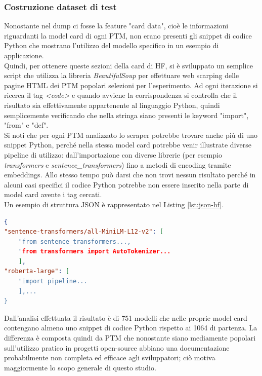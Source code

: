 \documentclass{article}
\begin{document}
\subsubsection{Costruzione dataset di test}
Nonostante nel dump \cite{ait_hfcommunity_2023}  ci fosse la feature "card data", cioè le informazioni riguardanti la model card di ogni PTM, non erano presenti gli snippet di codice Python che mostrano l'utilizzo del modello specifico in un esempio di applicazione.\\  
Quindi, per ottenere queste sezioni della card di HF, si è sviluppato un semplice script che utilizza la libreria \textit{BeautifulSoup}\cite{Richardson_Beautiful_Soup} per effettuare web scarping delle pagine HTML dei PTM popolari selezioni per l'esperimento. Ad ogni iterazione si ricerca il tag \textit{\textless code\textgreater} e quando avviene la corrispondenza si controlla che il risultato sia effettivamente appartenente al linguaggio Python, quindi semplicemente verificando che nella stringa siano presenti le keyword "import", "from" e "def".\\
Si noti che per ogni PTM analizzato lo scraper potrebbe trovare anche più di uno snippet Python, perché nella stessa model card potrebbe venir illustrate diverse pipeline di utilizzo: dall'importazione con diverse librerie (per esempio \textit{transformers} e \textit{sentence\_transformers}) fino a metodi di encoding tramite embeddings. Allo stesso tempo può darsi che non trovi nessun risultato perché in alcuni casi specifici il codice Python potrebbe non essere inserito nella parte di model card avente i tag cercati.\\
Un esempio di struttura JSON è rappresentato nel Listing \ref{lst:json-hf}.\\
\begin{lstlisting}[language=json, caption={Esempio di struttura per le card ufficiali di HF}, label={lst:json-hf}]
{
"sentence-transformers/all-MiniLM-L12-v2": [ 
    "from sentence_transformers..., 
    "from transformers import AutoTokenizer...
    ],
"roberta-large": [
    "import pipeline...
    ],...
}
\end{lstlisting}
Dall'analisi effettuata il risultato è di 751 modelli che nelle proprie model card contengano almeno uno snippet di codice Python rispetto ai 1064 di partenza. La differenza è composta quindi da PTM che nonostante siano mediamente popolari sull'utilizzo pratico in progetti open-source abbiano una documentazione probabilmente non completa ed efficace agli sviluppatori; ciò motiva maggiormente lo scopo generale di questo studio.
\end{document}
